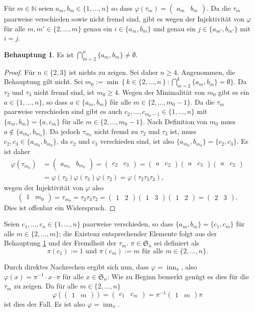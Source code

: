 \documentclass[a4paper,10pt]{article}
\theoremstyle{definition}
\newtheorem{beh}{Behauptung}
\newcommand{\N}{\mathbb{N}}
\newcommand{\Sn}{\mathfrak{S}}
\newcommand{\inn}{\operatorname{inn}}
\newcommand{\vect}[1]{\begin{pmatrix}#1\end{pmatrix}}
\begin{document}
Für $m \in \N$ seien $a_m, b_m \in \{1,\ldots,n\}$ so dass $\varphi(\tau_m) = \vect{a_m & b_m}$. Da die $\tau_m$ paarweise verschieden sowie nicht fremd sind, gibt es wegen der Injektivität von $\varphi$ für alle $m, m' \in \{2, \ldots, m\}$ genau ein $i \in \{a_m, b_m\}$ und genau ein $j \in \{a_{m'}, b_{m'}\}$ mit $i = j$.

\begin{beh}\label{beh: transpositionen gemeinsames element}
 Es ist $\bigcap_{m=2}^n \{a_m, b_m\} \neq \emptyset$.
\end{beh}
\begin{proof}
 Für $n \in \{2,3\}$ ist nichts zu zeigen. Sei daher $n \geq 4$. Angenommen, die Behauptung gilt nicht. Sei $m_0 := \min \left\{k \in \{2,\ldots,n\right\} : \bigcap_{m=2}^k \{a_m,b_m\} = \emptyset\}$. Da $\tau_2$ und $\tau_3$ nicht fremd sind, ist $m_0 \geq 4$. Wegen der Minimalität von $m_0$ gibt es ein \mbox{$a \in \{1,\ldots,n\}$}, so dass $a \in \{a_m,b_m\}$ für alle $m \in \{2,\ldots,m_0-1\}$. Da die $\tau_m$ paarweise verschieden sind gibt es auch $c_2, \ldots, c_{m_0-1} \in \{1,\ldots,n\}$ mit $\{a_m, b_m\} = \{a, c_m\}$ für alle $m \in \{2, \ldots, m_0 -1\}$. Nach Definition von $m_0$ muss $a \not \in \{a_{m_0}, b_{m_0}\}$. Da jedoch $\tau_{m_0}$ nicht fremd zu $\tau_2$ und $\tau_3$ ist, muss $c_2, c_3 \in \{a_{m_0},b_{m_0}\}$, da $c_2$ und $c_3$ verschieden sind, ist also $\{a_{m_0}, b_{m_0}\} = \{c_2, c_3\}$.
 Es ist daher
 \begin{align*}
  \varphi(\tau_{m_0})
  &= \vect{a_{m_0} &  b_{m_0}} = \vect{c_2 & c_3} = \vect{a & c_2} \vect{a & c_3} \vect{a & c_2} \\
  &= \varphi(\tau_2)\varphi(\tau_3)\varphi(\tau_2) = \varphi(\tau_2 \tau_3 \tau_2),
 \end{align*}
 wegen der Injektivität von $\varphi$ also
 \[
  \vect{1 & m_0} = \tau_{m_0} = \tau_2 \tau_3 \tau_2 = \vect{1 & 2} \vect{1 & 3} \vect{1 & 2} = \vect{2 & 3}.
 \]
 Dies ist offenbar ein Widerspruch.
\end{proof}

Seien $c_1, \ldots, c_n \in \{1,\ldots,n\}$ paarweise verschieden, so dass $\{a_m, b_m\} = \{c_1, c_m\}$ für alle $m \in \{2,\ldots,m\}$; die Existenz entsprechender Elemente folgt aus der Behauptung \ref{beh: transpositionen gemeinsames element} und der Fremdheit der $\tau_m$. $\pi \in \Sn_n$ sei definiert als
\[
 \pi(c_1) := 1 \text{ und } \pi(c_m) := m \text{ für alle } m \in \{2,\ldots,n\}.
\]

Durch direktes Nachrechen ergibt sich nun, dass $\varphi = \inn_\pi$, also $\varphi(x) = \pi^{-1} \cdot x \cdot \pi$ für alle $x \in \Sn_n$: Wie zu Beginn bemerkt genügt es dies für die $\tau_m$ zu zeigen. Da für alle $m \in \{2, \ldots, n\}$
\[
 \varphi(\vect{1 & m}) = \vect{c_1 & c_m} = \pi^{-1} \vect{1 & m} \pi
\]
ist dies der Fall. Es ist also $\varphi = \inn_\pi$.
\end{document}
